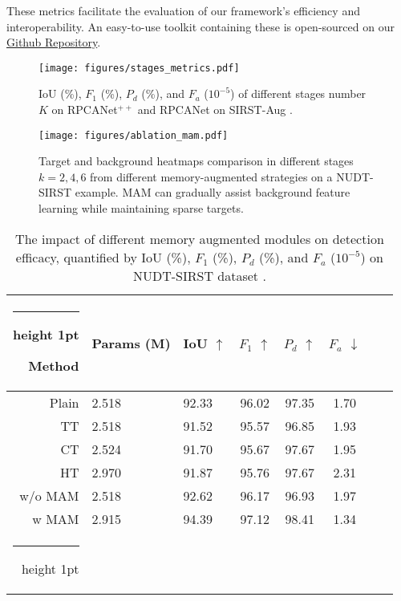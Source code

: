 \documentclass[10pt,journal,compsoc]{IEEEtran}
\makeatletter
\newcommand{\thickhline}{%

    \noalign {\ifnum 0=`}\fi \hrule height 1pt
    \futurelet \reserved@a \@xhline
}
\makeatother
\begin{document}
These metrics facilitate the evaluation of our framework's efficiency and interoperability. An easy-to-use toolkit containing these is open-sourced on our \href{https://github.com/fengyiwu98/RPCANet}{Github Repository}.
\begin{figure}[!t]
\setlength{\abovecaptionskip}{1pt}
\setlength{\belowcaptionskip}{1pt}
\centering
   \texttt{[image: figures/stages\_metrics.pdf]}
   \caption{IoU (\%), $F_1$ (\%), $P_d$ (\%), and $F_a$ ($10^{-5}$) of different stages number $K$ on RPCANet$^{++}$ and RPCANet \cite{wu-2024-rpcanet} on SIRST-Aug \cite{zhang-2023-agpc}. }
   \label{fig:stages}
   \vspace{-0.4cm}
\end{figure}
\begin{figure}[!t]
\setlength{\abovecaptionskip}{2pt}
\setlength{\belowcaptionskip}{2pt}
\centering
   \texttt{[image: figures/ablation\_mam.pdf]}
   \caption{Target and background heatmaps comparison in different stages $k=2,4,6$ from different memory-augmented strategies on a NUDT-SIRST \cite{li-2023-dnanet} example. MAM can gradually assist background feature learning while maintaining sparse targets.}
   \label{fig:abl_mam}
   \vspace{-0.4cm}
\end{figure}
\setlength{\abovecaptionskip}{2pt}
\setlength{\belowcaptionskip}{2pt}
\begin{table}[t]
\caption{The impact of different memory augmented modules on detection efficacy, quantified by IoU (\%), $F_1$ (\%), $P_d$ (\%), and $F_a$ ($10^{-5}$) on NUDT-SIRST dataset \cite{li-2023-dnanet}.}
\footnotesize
\renewcommand\arraystretch{1.1}
\centering
\begin{tabular}{rIIccccc}
\hline\thickhline
{}\textbf{Method} &\textbf{Params (M)}& IoU $\uparrow$ & $F_1$ $\uparrow$ & $P_d$ $\uparrow$ & $F_a$  $\downarrow$ \\ \hline\hline
Plain   &  2.518 &  92.33   & 96.02 & 97.35 &1.70  \\ 
TT \cite{zhang-2023-ctnet}   &  2.518 &  91.52 &95.57  & 96.85  & 1.93      \\ 
CT  \cite{zhang-2023-ctnet}   &  2.524 &  91.70   & 95.67  &  97.67 & 1.95  \\
HT \cite{song-2021-madun}    & 2.970 &  91.87  & 95.76 &  97.67  & 2.31 \\ \hline
w/o MAM     &  2.518   &  92.62  & 96.17 & 96.93    &  1.97    \\
w MAM     &  2.915   &  94.39   &  97.12 & 98.41    &  1.34    \\ 
\hline\thickhline
\end{tabular}
\label{tab:mam}
\vspace{-0.35cm}
\end{table}
\end{document}
